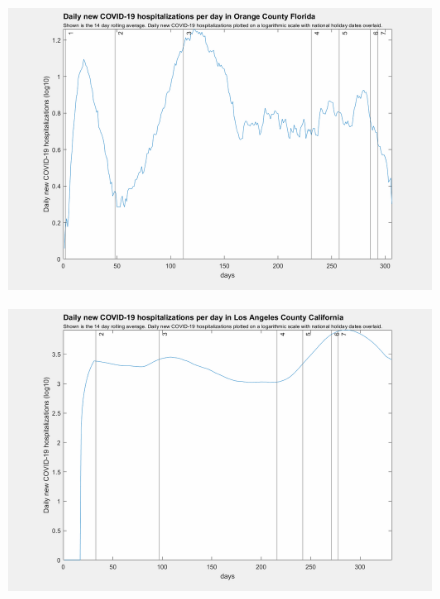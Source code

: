 \documentclass[]{article}
\begin{document}
\begin{figure}[!h]
	\includegraphics[width=\linewidth]{images/orange_hospitalizations_holiday_log.png}
	\caption{}
	\label{fig:images/orange_hospitalizations_holiday_logLabel}
\end{figure}

\begin{figure}[!h]
	\includegraphics[width=\linewidth]{images/los_angeles_hospitalizations_holiday_log.png}
	\caption{}
	\label{fig:images/los_angeles_hospitalizations_holiday_logLabel}
\end{figure}
\end{document}
